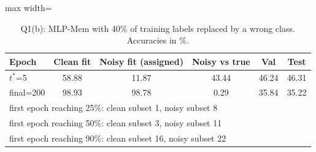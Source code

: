 \begin{table}[t]\centering\footnotesize\setlength{\tabcolsep}{3pt}
\begin{adjustbox}{max width=\columnwidth}
\begin{tabular}{lccccc}\toprule
Epoch & Clean fit & Noisy fit (assigned) & Noisy vs true & Val & Test \\\midrule
$t^*$=5 & 58.88 & 11.87 & 43.44 & 46.24 & 46.31 \\
final=200 & 98.93 & 98.78 & 0.29 & 35.84 & 35.22 \\\midrule
\multicolumn{6}{l}{first epoch reaching 25\%: clean subset 1, noisy subset 8} \\
\multicolumn{6}{l}{first epoch reaching 50\%: clean subset 3, noisy subset 11} \\
\multicolumn{6}{l}{first epoch reaching 90\%: clean subset 16, noisy subset 22} \\
\bottomrule\end{tabular}
\end{adjustbox}
\caption{Q1(b): MLP-Mem with 40\% of training labels replaced by a wrong class. Accuracies in \%.}\label{tab:q1b}\end{table}
